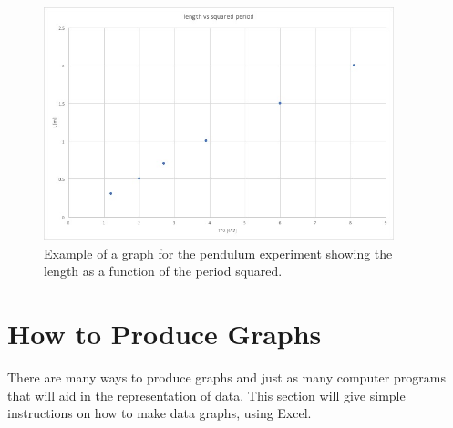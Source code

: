 \begin{figure}%
  \begin{center}
    \includegraphics[width=4in]{IntroductionFigures/graph.jpg}
  \end{center}
  \caption{Example of a graph for the pendulum experiment showing the length as a function of the period squared.}
  \label{fig:graph}
\end{figure}

\section{How to Produce Graphs}

There are many ways to produce graphs and just as many computer programs that will aid in the representation of data. This section will give simple instructions on how to make data graphs, using Excel.


